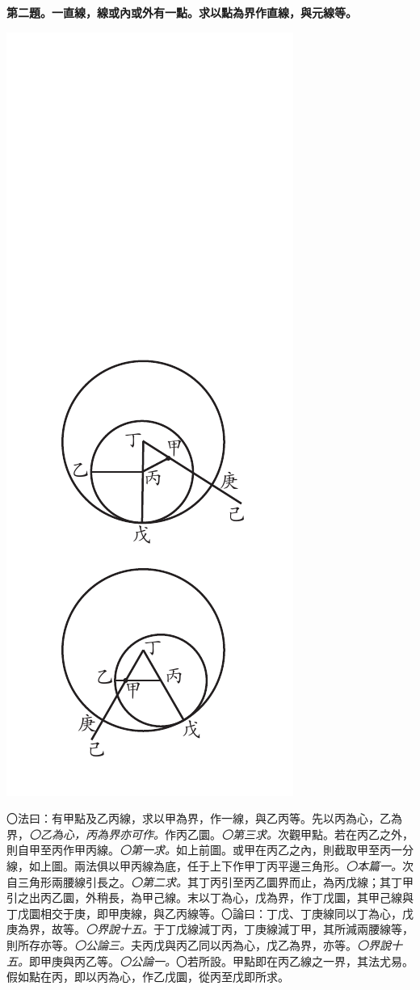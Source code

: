 \documentclass[12pt,b5paper,landscape]{article}
\newcommand{\ccom}[1]{{\footnotesize \emph{〇#1}}}
\newcommand{\bcom}[1]{〇#1}
\newcommand{\cthm}[1]{{
\vspace{8pt}

\bfseries #1}}
\begin{document}
\begin{multicols}{2}
\cthm{第二題。一直線，線或內或外有一點。求以點為界作直線，與元線等。}
\begin{center}
\includegraphics[angle=90]{eu36}
\end{center}
\bcom{法曰：有甲點及乙丙線，求以甲為界，作一線，與乙丙等。先以丙為心，乙為界，\ccom{乙為心，丙為界亦可作。}作丙乙圜。\ccom{第三求。}次觀甲點。若在丙乙之外，則自甲至丙作甲丙線。\ccom{第一求。}如上前圖。或甲在丙乙之內，則截取甲至丙一分線，如上圖。兩法俱以甲丙線為底，任于上下作甲丁丙平邊三角形。\ccom{本篇一。}次自三角形兩腰線引長之。\ccom{第二求。}其丁丙引至丙乙圜界而止，為丙戊線；其丁甲引之出丙乙圜，外稍長，為甲己線。末以丁為心，戊為界，作丁戊圜，其甲己線與丁戊圜相交于庚，即甲庚線，與乙丙線等。}\bcom{論曰：丁戊、丁庚線同以丁為心，戊庚為界，故等。\ccom{界說十五。}于丁戊線減丁丙，丁庚線減丁甲，其所減兩腰線等，則所存亦等。\ccom{公論三。}夫丙戊與丙乙同以丙為心，戊乙為界，亦等。\ccom{界說十五。}即甲庚與丙乙等。\ccom{公論一。}}\bcom{若所設。甲點即在丙乙線之一界，其法尤易。假如點在丙，即以丙為心，作乙戊圜，從丙至戊即所求。}


\end{multicols}
\end{document}
